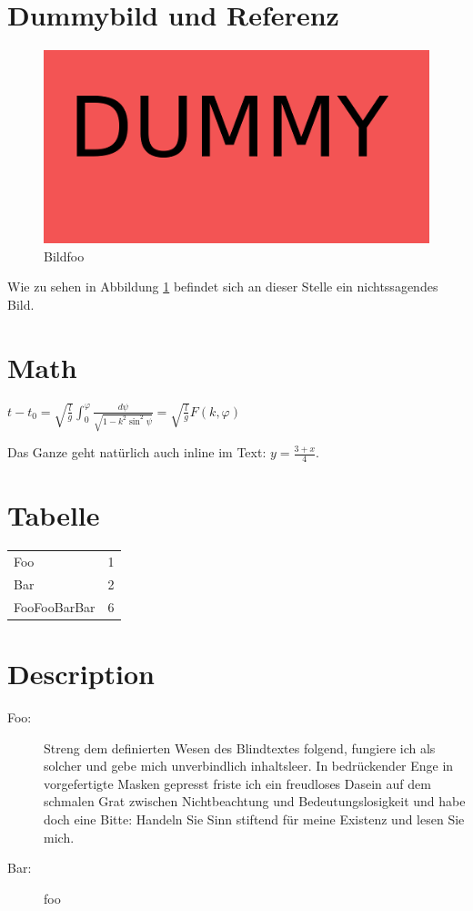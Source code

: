 \documentclass[a4paper,parskip=half,oneside]{scrbook}
\begin{document}
\section{Dummybild und Referenz}

  \begin{figure}[htbp]
    \centering
    \includegraphics[width=\textwidth,angle=30]{imgfoo}
    \caption{Bildfoo}
    \label{img:foo}
  \end{figure}

Wie zu sehen in Abbildung \ref{img:foo} befindet sich an dieser Stelle ein nichtssagendes Bild.

\section{Math}
\begin{math}
	t-t_{0}=\sqrt{\frac{l}{g}}\int_{0}^{\varphi}{\frac{d\psi}{\sqrt{1-k^{2}\sin^{2} {\psi}}}} = \sqrt{\frac{l}{g}} F(k,\varphi)
\end{math}

Das Ganze geht natürlich auch inline im Text: $y=\frac{3 + x}{4}$.

\section{Tabelle}
\begin{tabular}{l r}
Foo  & 1 \\
Bar & 2 \\
FooFooBarBar  & 6 \\
\end{tabular}

\section{Description}
  \begin{description}
    \item [Foo:]  Streng dem definierten Wesen des Blindtextes folgend, fungiere ich als solcher und gebe mich unverbindlich inhaltsleer. In bedrückender Enge in vorgefertigte Masken gepresst friste ich ein freudloses Dasein auf dem schmalen Grat zwischen Nichtbeachtung und Bedeutungslosigkeit und habe doch eine Bitte: Handeln Sie Sinn stiftend für meine Existenz und lesen Sie mich.
    \item [Bar:] foo
  \end{description}
\end{document}
